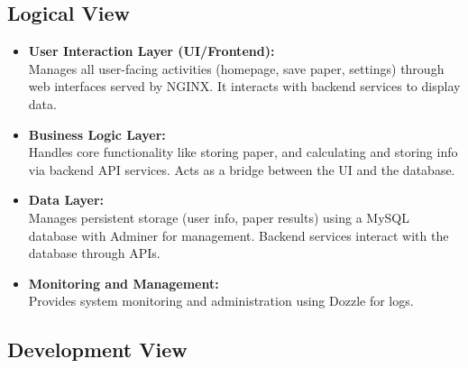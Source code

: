 \documentclass[12pt]{article}
\begin{document}
\subsection{Logical View}

\begin{itemize}
    \item \textbf{User Interaction Layer (UI/Frontend):}\\
    Manages all user-facing activities (homepage, save paper, settings) through web interfaces served by NGINX. It interacts with backend services to display data.

    \item \textbf{Business Logic Layer:}\\
    Handles core functionality like storing paper, and calculating and storing info via backend API services. Acts as a bridge between the UI and the database.

    \item \textbf{Data Layer:}\\
    Manages persistent storage (user info, paper results) using a MySQL database with Adminer for management. Backend services interact with the database through APIs.

    \item \textbf{Monitoring and Management:}\\
    Provides system monitoring and administration using Dozzle for logs.
\end{itemize}

\subsection{Development View}
\end{document}
